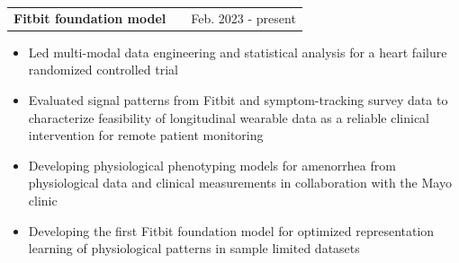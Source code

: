 \documentclass[a4paper,12pt]{article}
\makeatletter
\newenvironment{projectlong}[2]
    {
    \vspace{-0.3em}
    \begin{tabularx}{\linewidth}{@{}l X r@{}}
    \textbf{#1} & \hfill &  #2 \\
    \end{tabularx}
    \begin{minipage}[t]{\linewidth}
    \begin{itemize}[nosep,after=\strut, leftmargin=1em, itemsep=2.5pt,label=\scriptsize$\bullet$]
    }
    {
    \end{itemize}
    \end{minipage}
    \vspace{-0.3em}
    }
\makeatother
\begin{document}
\begin{projectlong}{Fitbit foundation model}{Feb. 2023 - present}
    \item Led multi-modal data engineering and statistical analysis for a heart failure randomized controlled trial 
    \item Evaluated signal patterns from Fitbit and symptom-tracking survey data to characterize feasibility of longitudinal wearable data as a reliable clinical intervention for remote patient monitoring
    \item Developing physiological phenotyping models for amenorrhea from physiological data and clinical measurements in collaboration with the Mayo clinic
    \item Developing the first Fitbit foundation model for optimized representation learning of physiological patterns in sample limited datasets
\end{projectlong}





\end{document}
